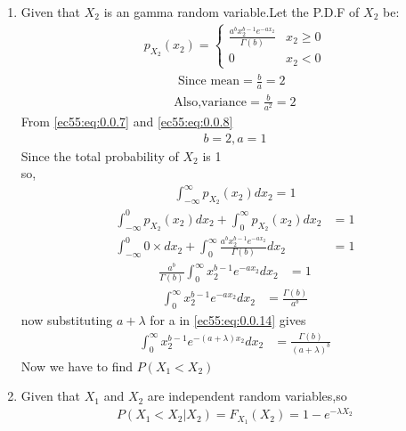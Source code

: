 \begin{enumerate}
    \item Given that $X_2$ is an gamma random variable.Let the P.D.F of $X_2$ be:
    \begin{align}
        p_{X_2}(x_2)=
        \begin{cases}
            \frac{a^b x_2^{b-1}e^{-ax_2}}{\Gamma(b)} & x_2\geq 0\\
            0 & x_2<0
        \end{cases}\label{ec55:eq:0.0.6}
    \end{align}
    \begin{align}
       \text{ Since mean}=\frac{b}{a}=2\label{ec55:eq:0.0.7}\\
         \text{Also,variance}=\frac{b}{a^2}=2\label{ec55:eq:0.0.8}
    \end{align}
  From \eqref{ec55:eq:0.0.7} and \eqref{ec55:eq:0.0.8}
  \begin{align}
      b=2,a=1\label{ec55:eq:0.0.9}
  \end{align}
  Since the total probability of $X_2$ is 1 \\
  so,\begin{align}
      \int_{-\infty}^\infty p_{X_2}(x_2) dx_2=1
      \end{align}
      \begin{align}
      \int_{-\infty} ^0 p_{X_2}(x_2)
     dx_2+\int_{0}^\infty p_{X_2}(x_2) dx_2&=1\\
      \int_{-\infty} ^0 0\times dx_2+\int_{0}^\infty \frac{a^b x_2^{b-1}e^{-ax_2}}{\Gamma(b)} dx_2&=1
      \end{align}
      \begin{align}
      \frac{a^b}{\Gamma(b)} \int_{0}^\infty x_2^{b-1}e^{-ax_2} dx_2&=1
      \end{align}
      \begin{align}
          \int_{0}^\infty x_2^{b-1}e^{-ax_2} dx_2&=\frac{\Gamma(b)}{a^b}\label{ec55:eq:0.0.14}
  \end{align}
  now substituting $a+\lambda$ for a in \eqref{ec55:eq:0.0.14} gives 
  \begin{align}
      \int_{0}^\infty x_2^{b-1}e^{-(a+\lambda)x_2} dx_2&=\frac{\Gamma(b)}{(a+\lambda)^b}\label{ec55:eq:0.0.15}
  \end{align}
  Now we have to find $P(X_1<X_2)$\\
  \item Given that $X_1$ and $X_2$ are independent random variables,so
  \begin{align}
     P(X_1<X_2|X_2)=F_{X_1}(X_2)=1-e^{-\lambda X_2}\label{ec55:eq:0.0.16}

\end{align}
\end{enumerate}
